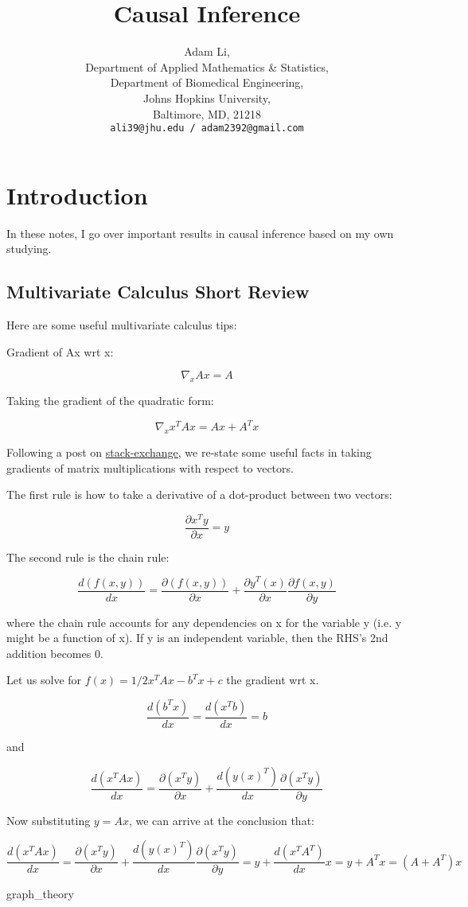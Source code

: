 \documentclass{article}
\title{Causal Inference}
\author{
  Adam Li, \\
  Department of Applied Mathematics \& Statistics, \\
  Department of Biomedical Engineering, \\
  Johns Hopkins University, \\
  Baltimore, MD, 21218 \\
  \texttt{ali39@jhu.edu / adam2392@gmail.com}
}
\theoremstyle{proposition}
\begin{document}
\maketitle

\tableofcontents

\section{Introduction}
	In these notes, I go over important results in causal inference based on my own studying. 

  \subsection{Multivariate Calculus Short Review}
    Here are some useful multivariate calculus tips:

    Gradient of Ax wrt x: 

      $$\nabla_x Ax = A$$

    Taking the gradient of the quadratic form:

      $$\nabla_x x^T A x = Ax + A^T x$$

    Following a post on \href{https://math.stackexchange.com/questions/222894/how-to-take-the-gradient-of-the-quadratic-form?noredirect=1&lq=1}{stack-exchange}, we re-state some useful facts in taking gradients of matrix multiplications with respect to vectors.

    The first rule is how to take a derivative of a dot-product between two vectors:

      $$\frac{\partial x^T y}{\partial x} = y$$

    The second rule is the chain rule:

      $$\frac{d(f(x,y))}{dx} = \frac{\partial (f(x,y))}{\partial x} + \frac{\partial y^T(x)}{\partial x} \frac{\partial f(x, y)}{\partial y}$$

    where the chain rule accounts for any dependencies on x for the variable y (i.e. y might be a function of x). If y is an independent variable, then the RHS's 2nd addition becomes 0.

    Let us solve for $f(x) = 1/2 x^T A x - b^T x + c$ the gradient wrt x.

      $$\dfrac{d(b^Tx)}{d x} = \dfrac{d (x^Tb)}{d x} = b$$

    and

      $$\dfrac{d (x^TAx)}{d x} = \dfrac{\partial (x^Ty)}{\partial x} +  \dfrac{d (y(x)^T)}{d x} \dfrac{\partial (x^Ty)}{\partial y}$$

    Now substituting $y = Ax$, we can arrive at the conclusion that:

      $$\dfrac{d (x^TAx)}{d x} = \dfrac{\partial (x^Ty)}{\partial x} +  \dfrac{d( y(x)^T)}{d x} \dfrac{\partial (x^Ty)}{\partial y} = y + \dfrac{d (x^TA^T)}{d x} x = y + A^Tx = (A+A^T)x$$

{graph_theory}
\end{document}

